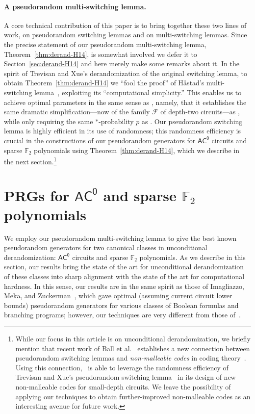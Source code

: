 \documentclass{toc}
\theoremstyle{plain}
\newcommand{\acz}{\mathsf{AC^0}}
\renewcommand{\F}{\mathds{F}}
\begin{document}
\paragraph{A pseudorandom multi-switching lemma.}  A core technical contribution of this paper is to bring together these two lines of work, on pseudorandom switching lemmas and on multi-switching lemmas.  
Since the precise statement of our pseudorandom multi-switching lemma, Theorem~\ref{thm:derand-H14}, is somewhat involved we defer it to Section~\ref{sec:derand-H14} and here merely make some remarks about it. 
In the spirit of Trevisan and Xue's derandomization of the original switching lemma, to obtain Theorem~\ref{thm:derand-H14} we ``fool the proof'' of H{\aa}stad's multi-switching lemma~\cite{Has14}, exploiting its ``computational simplicity.''   This enables us to achieve optimal parameters in the same sense as \cite{TX13}, namely, that it establishes the same dramatic simplification---now of the family $\mathscr{F}$ of depth-two circuits---as \cite{Has14},
%
while only requiring the same $\ast$-probability $p$ as \cite{Has14}. Our pseudorandom switching lemma is highly efficient in its use of randomness;
this randomness efficiency is crucial in the constructions of our pseudorandom generators for $\acz$ circuits and sparse $\F_2$ polynomials using Theorem~\ref{thm:derand-H14}, which we %
describe in the next section.\footnote{While our focus in this
%
article  %
is on unconditional derandomization, we briefly mention that recent work of Ball et al.~\cite{BDGMT18} establishes a new connection between pseudorandom switching lemmas and \emph{non-malleable codes} in coding theory~\cite{DPW18}.  Using this connection,~\cite{BDGMT18} 
%
is %
able to leverage the randomness efficiency
%
of Trevisan and Xue's pseudorandom switching lemma~\cite{TX13}
%
in its  %
design of new non-malleable codes for small-depth circuits.  We leave the possibility of applying our techniques to obtain further-improved non-malleable codes as an interesting avenue for future work. }

\section{PRGs for $\acz$ and sparse $\F_2$ polynomials} \label{sec:applic}

We employ our pseudorandom multi-switching lemma to give the best known pseudorandom generators for two canonical classes in unconditional derandomization: $\acz$ circuits and sparse $\F_2$ polynomials. 
As we describe in this section, our results bring the state of the art for unconditional derandomization of these classes into sharp alignment with the state of the art for computational hardness.
%
%
%
%
%
%
%
 In this sense, our results are in the same spirit as those of Imagliazzo, Meka, and Zuckerman~\cite{IMZ12journal}, which gave optimal (assuming current circuit lower bounds) pseudorandom generators for various classes of Boolean formulas and branching programs; however, our techniques are very different from those of~\cite{IMZ12journal}. 
\end{document}
